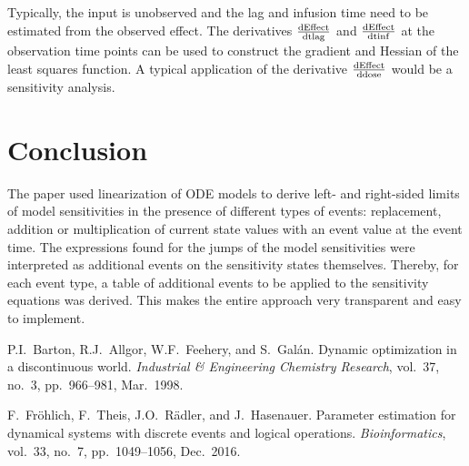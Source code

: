 \documentclass[journal, a4paper]{IEEEtran}
\begin{document}
Typically, the input is unobserved and the lag and infusion time need to be estimated from the observed effect. The derivatives $\frac{\rm dEffect}{\rm dtlag}$ and $\frac{\rm dEffect}{\rm dtinf}$ at the observation time points can be used to construct the gradient and Hessian of the least squares function. A typical application of the derivative $\frac{\rm dEffect}{\rm ddose}$ would be a sensitivity analysis.



\section{Conclusion}
The paper used linearization of ODE models to derive left- and right-sided limits of model sensitivities in the presence of different types of events: replacement, addition or multiplication of current state values with an event value at the event time. The expressions found for the jumps of the model sensitivities were interpreted as additional events on the sensitivity states themselves. Thereby, for each event type, a table of additional events to be applied to the sensitivity equations was derived. This makes the entire approach very transparent and easy to implement.

\begin{thebibliography}{9}

	P.I.~Barton, R.J.~Allgor, W.F.~Feehery, and S.~Galán. Dynamic optimization in a discontinuous world. {\em Industrial \& Engineering Chemistry Research}, vol.~37, no.~3, pp.~966--981, Mar.~1998.

	F.~Fr{\"o}hlich, F.~Theis, J.O.~R{\"a}dler, and J.~Hasenauer. Parameter estimation for dynamical systems with discrete events and logical operations. {\em Bioinformatics}, vol.~33, no.~7, pp.~1049--1056, Dec.~2016.


\end{thebibliography}

\end{document}
